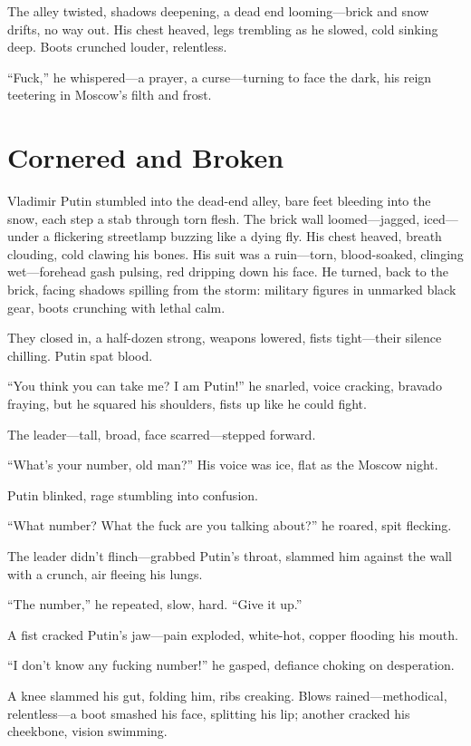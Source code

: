 \documentclass[12pt]{book}
\begin{document}
The alley twisted, shadows deepening, a dead end looming---brick and snow drifts, no way out. His chest heaved, legs trembling as he slowed, cold sinking deep. Boots crunched louder, relentless.

\enquote{Fuck,} he whispered---a prayer, a curse---turning to face the dark, his reign teetering in Moscow’s filth and frost.

\section{Cornered and Broken}

Vladimir Putin stumbled into the dead-end alley, bare feet bleeding into the snow, each step a stab through torn flesh. The brick wall loomed---jagged, iced---under a flickering streetlamp buzzing like a dying fly. His chest heaved, breath clouding, cold clawing his bones. His suit was a ruin---torn, blood-soaked, clinging wet---forehead gash pulsing, red dripping down his face. He turned, back to the brick, facing shadows spilling from the storm: military figures in unmarked black gear, boots crunching with lethal calm.

They closed in, a half-dozen strong, weapons lowered, fists tight---their silence chilling. Putin spat blood.

\enquote{You think you can take me? I am Putin!} he snarled, voice cracking, bravado fraying, but he squared his shoulders, fists up like he could fight.

The leader---tall, broad, face scarred---stepped forward.

\enquote{What’s your number, old man?} His voice was ice, flat as the Moscow night.

Putin blinked, rage stumbling into confusion.

\enquote{What number? What the fuck are you talking about?} he roared, spit flecking.

The leader didn’t flinch---grabbed Putin’s throat, slammed him against the wall with a crunch, air fleeing his lungs.

\enquote{The number,} he repeated, slow, hard. \enquote{Give it up.}

A fist cracked Putin’s jaw---pain exploded, white-hot, copper flooding his mouth.

\enquote{I don’t know any fucking number!} he gasped, defiance choking on desperation.

A knee slammed his gut, folding him, ribs creaking. Blows rained---methodical, relentless---a boot smashed his face, splitting his lip; another cracked his cheekbone, vision swimming.
\end{document}
